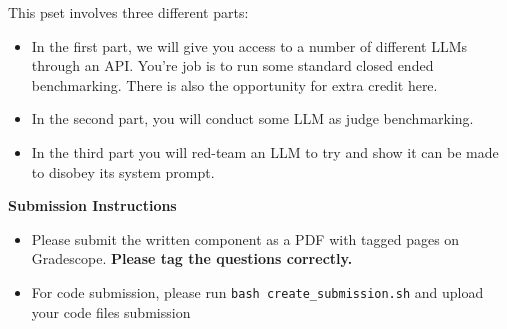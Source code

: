 \documentclass[answers]{exam}
\begin{document}
This pset involves three different parts:

\begin{itemize}
    \item In the first part, we will give you access 
    to a number of different LLMs through an API. You're 
    job is to run some standard closed 
    ended benchmarking. There is also the opportunity for 
    extra credit here.
    \item In the second part, you will conduct 
    some LLM as judge benchmarking.
    \item In the third part you will red-team an LLM 
    to try and show it can be made to disobey its system prompt.
\end{itemize}

\newpage

\begin{questions}
    
    
    \newpage
    
    
    \newpage 
    
    
    
    \newpage
    
\end{questions}

\Large{\textbf{Submission Instructions}}


\normalsize

\begin{itemize}
    \item Please submit the written component as a PDF with tagged pages on Gradescope. \textbf{Please tag the questions correctly.}
    \item For code submission, please run \texttt{bash create\_submission.sh} and upload your code files submission 
\end{itemize}
\end{document}
